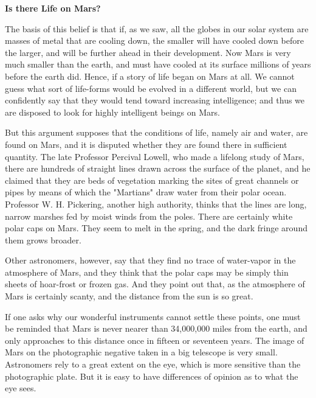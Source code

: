 \bigskip
\begin{center}
\textbf{Is there Life on Mars?}
\end{center}

\begin{spacing}{2}
\begin{linenumbers*}
\modulolinenumbers[5]
\indent The basis of this belief is that if, as we saw, all the globes in our solar system are masses of metal that are cooling down, the smaller will have cooled down before the larger, and will be further ahead in their development. Now Mars is very much smaller than the earth, and must have cooled at its surface millions of years before the earth did. Hence, if a story of life began on Mars at all. We cannot guess what sort of life-forms would be evolved in a different world, but we can confidently say that they would tend toward increasing intelligence; and thus we are disposed to look for highly intelligent beings on Mars.

\indent But this argument supposes that the conditions of life, namely air and water, are found on Mars, and it is disputed whether they are found there in sufficient quantity. The late Professor Percival Lowell, who made a lifelong study of Mars, there are hundreds of straight lines drawn across the surface of the planet, and he claimed that they are beds of vegetation marking the sites of great channels or pipes by means of which the "Martians" draw water from their polar ocean. Professor W. H. Pickering, another high authority, thinks that the lines are long, narrow marshes fed by moist winds from the poles. There are certainly white polar caps on Mars. They seem to melt in the spring, and the dark fringe around them grows broader.

\indent Other astronomers, however, say that they find no trace of water-vapor in the atmosphere of Mars, and they think that the polar caps may be simply thin sheets of hoar-frost or frozen gas. And they point out that, as the atmosphere of Mars is certainly scanty, and the distance from the sun is so great.

\indent If one asks why our wonderful instruments cannot settle these points, one must be reminded that Mars is never nearer than 34,000,000 miles from the earth, and only approaches to this distance once in fifteen or seventeen years. The image of Mars on the photographic negative taken in a big telescope is very small. Astronomers rely to a great extent on the eye, which is more sensitive than the photographic plate. But it is easy to have differences of opinion as to what the eye sees.


\end{linenumbers*}
\end{spacing}
